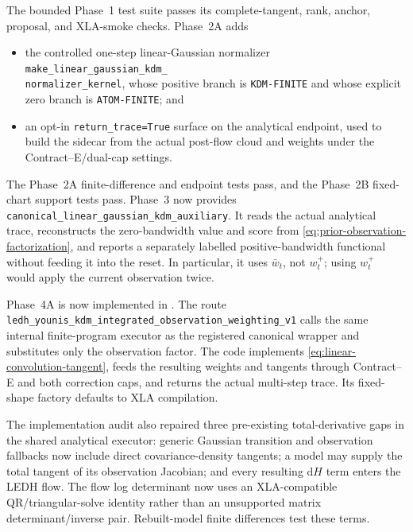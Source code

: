 \documentclass[11pt]{article}
\newcommand{\dd}{\mathrm{d}}
\begin{document}
\begin{samepage}
The bounded Phase~1 test suite passes its complete-tangent, rank, anchor,
proposal, and XLA-smoke checks.  Phase~2A adds

\begin{itemize}[leftmargin=2em]
  \item the controlled one-step linear-Gaussian normalizer\\
        \texttt{make\_linear\_gaussian\_kdm\_}\\
        \texttt{normalizer\_kernel}, whose
        positive branch is \texttt{KDM-FINITE} and whose explicit zero branch
        is \texttt{ATOM-FINITE}; and
  \item an opt-in \texttt{return\_trace=True} surface on the analytical
        endpoint, used to build the sidecar from the actual post-flow cloud
        and weights under the Contract--E/dual-cap settings.
\end{itemize}
\end{samepage}

The Phase~2A finite-difference and endpoint tests pass, and the Phase~2B
fixed-chart support tests pass.  Phase~3 now provides
\texttt{canonical\_linear\_gaussian\_kdm\_auxiliary}.  It reads the actual
analytical trace, reconstructs the zero-bandwidth value and score from
\eqref{eq:prior-observation-factorization}, and reports a separately labelled
positive-bandwidth functional without feeding it into the reset.  In
particular, it uses $\bar w_t$, not $w_t^+$; using $w_t^+$ would apply the
current observation twice.

Phase~4A is now implemented in
.  The route
\texttt{ledh\_younis\_kdm\_integrated\_observation\_weighting\_v1} calls the
same internal finite-program executor as the registered canonical wrapper and
substitutes only the observation factor.  The code implements
\eqref{eq:linear-convolution-tangent}, feeds the resulting weights and
tangents through Contract--E and both correction caps, and returns the actual
multi-step trace.  Its fixed-shape factory defaults to XLA compilation.

The implementation audit also repaired three pre-existing total-derivative
gaps in the shared analytical executor: generic Gaussian transition and
observation fallbacks now include direct covariance-density tangents; a model
may supply the total tangent of its observation Jacobian; and every resulting
$\dd H$ term enters the LEDH flow.  The flow log determinant now uses an
XLA-compatible QR/triangular-solve identity rather than an unsupported matrix
determinant/inverse pair.  Rebuilt-model finite differences test these terms.
\end{document}
